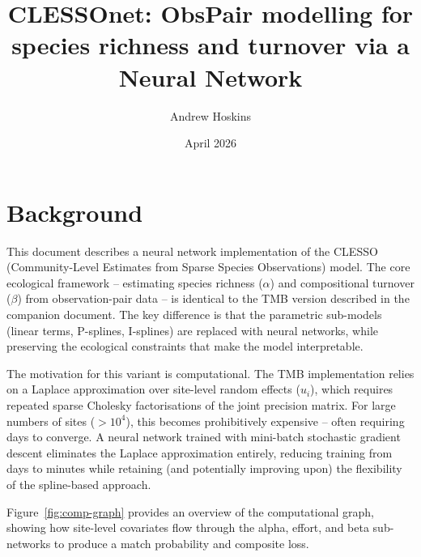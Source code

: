 \documentclass{article}
\title{CLESSOnet: ObsPair modelling for species richness and turnover via a Neural Network}
\author{Andrew Hoskins}
\date{April 2026}
\begin{document}
\maketitle

\section{Background}

This document describes a neural network implementation of the CLESSO (Community-Level Estimates from Sparse Species Observations) model. The core ecological framework -- estimating species richness ($\alpha$) and compositional turnover ($\beta$) from observation-pair data -- is identical to the TMB version described in the companion document. The key difference is that the parametric sub-models (linear terms, P-splines, I-splines) are replaced with neural networks, while preserving the ecological constraints that make the model interpretable.

The motivation for this variant is computational. The TMB implementation relies on a Laplace approximation over site-level random effects ($u_i$), which requires repeated sparse Cholesky factorisations of the joint precision matrix. For large numbers of sites ($>10^4$), this becomes prohibitively expensive -- often requiring days to converge. A neural network trained with mini-batch stochastic gradient descent eliminates the Laplace approximation entirely, reducing training from days to minutes while retaining (and potentially improving upon) the flexibility of the spline-based approach.

Figure~\ref{fig:comp-graph} provides an overview of the computational graph, showing how site-level covariates flow through the alpha, effort, and beta sub-networks to produce a match probability and composite loss.
\end{document}
